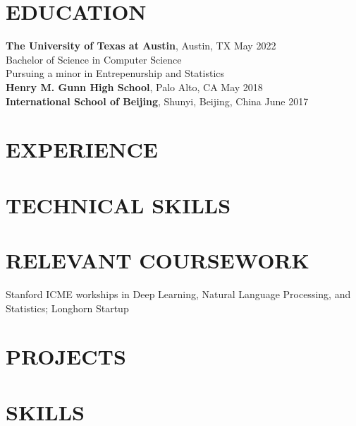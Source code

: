 \documentclass{res}
\begin{document}
 

\makeatletter
\def\@tablebox#1{\begin{tabular}[t]{@{}c@{}}#1\end{tabular}}
\makeatother


\address{ethan.houston@utexas.edu | linkedin.com/in/ethanhouston | github.com/ethanzh \\ Palo Alto, CA | 650-804-1750}

                               
\begin{resume}
        

\section{EDUCATION}          
	\textbf{The University of Texas at Austin}, Austin, TX \hfill May 2022 \\        
    	Bachelor of Science in Computer Science  \\       
    	Pursuing a minor in Entrepenurship and Statistics \\[4pt]       
    	\textbf{Henry M. Gunn High School}, Palo Alto, CA \hfill May 2018 \\[4pt]     
     	\textbf{International School of Beijing}, Shunyi, Beijing, China \hfill June 2017  \\        

 
\section{EXPERIENCE}


\section{TECHNICAL SKILLS}          

 
 
\section{RELEVANT COURSEWORK}          
	Stanford ICME workships in Deep Learning, Natural Language Processing, and Statistics; Longhorn Startup
 
\section{PROJECTS}          

\section{SKILLS}      

 
\end{resume}
\end{document}
